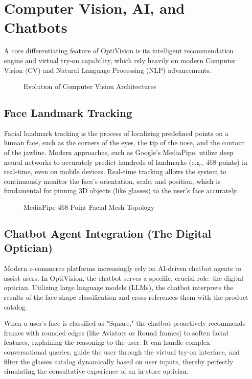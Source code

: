 \section{Computer Vision, AI, and Chatbots}
\label{sec:back_cv}

A core differentiating feature of OptiVision is its intelligent recommendation engine and virtual try-on capability, which rely heavily on modern Computer Vision (CV) and Natural Language Processing (NLP) advancements.

\begin{figure}[H]
    \centering
    \vspace{8cm}
    \caption{Evolution of Computer Vision Architectures}
    \label{fig:cv_evolution}
\end{figure}

\subsection{Face Landmark Tracking}
Facial landmark tracking is the process of localizing predefined points on a human face, such as the corners of the eyes, the tip of the nose, and the contour of the jawline. Modern approaches, such as Google's MediaPipe, utilize deep neural networks to accurately predict hundreds of landmarks (e.g., 468 points) in real-time, even on mobile devices. Real-time tracking allows the system to continuously monitor the face's orientation, scale, and position, which is fundamental for pinning 3D objects (like glasses) to the user's face accurately.

\begin{figure}[H]
    \centering
    \vspace{8cm}
    \caption{MediaPipe 468-Point Facial Mesh Topology}
    \label{fig:mediapipe_mesh}
\end{figure}

\subsection{Chatbot Agent Integration (The Digital Optician)}
Modern e-commerce platforms increasingly rely on AI-driven chatbot agents to assist users. In OptiVision, the chatbot serves a specific, crucial role: the digital optician. Utilizing large language models (LLMs), the chatbot interprets the results of the face shape classification and cross-references them with the product catalog. 

When a user's face is classified as "Square," the chatbot proactively recommends frames with rounded edges (like Aviators or Round frames) to soften facial features, explaining the reasoning to the user. It can handle complex conversational queries, guide the user through the virtual try-on interface, and filter the glasses catalog dynamically based on user inputs, thereby perfectly simulating the consultative experience of an in-store optician.
